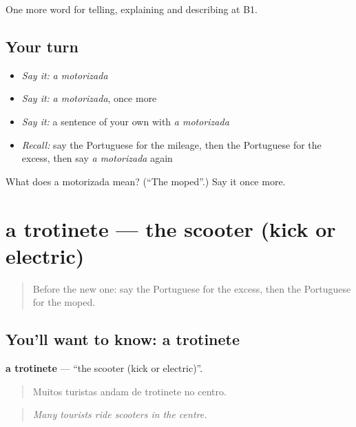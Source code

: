 \begin{grammarlens}[title={What you've built}]
One more word for telling, explaining and describing at B1.
\end{grammarlens}

\subsection*{Your turn}
\begin{itemize}
\raggedright
  \item \emph{Say it:} \emph{a motorizada}
  \item \emph{Say it:} \emph{a motorizada}, once more
  \item \emph{Say it:} a sentence of your own with \emph{a motorizada}
  \item \emph{Recall:} say the Portuguese for the mileage, then the Portuguese for the excess, then say \emph{a motorizada} again
\end{itemize}

\begin{tcolorbox}[breakable,colback=teal!4,colframe=teal!35!black,title={Before you move on}]
What does a motorizada mean? (\textquotedblleft{}The moped\textquotedblright{}.) Say it once more.
\end{tcolorbox}
\section[a trotinete]{a trotinete — the scooter (kick or electric)}

\label{lesson:PT-C412-trotinete}



\begin{quote}
Before the new one: say the Portuguese for the excess, then the Portuguese for the moped.
\end{quote}

\subsection*{You'll want to know: a trotinete}
\textbf{a trotinete} — \textquotedblleft{}the scooter (kick or electric)\textquotedblright{}.

\begin{quote}
Muitos turistas andam de trotinete no centro.
\end{quote}

\begin{quote}
\emph{Many tourists ride scooters in the centre.}
\end{quote}

